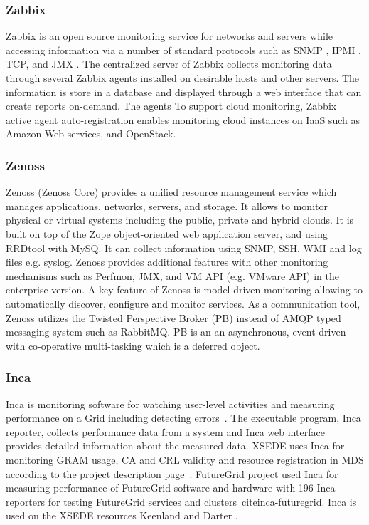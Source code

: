 \documentclass{sig-alternate-05-2015}
\begin{document}
\subsubsection{Zabbix}

Zabbix is an open source monitoring service for networks and servers while accessing information via a number of standard protocols such as SNMP \cite{case1990simple}, IPMI \cite{dell2009ipmi}, TCP, \cite{cerf2005protocol} and JMX \cite{perry2002java}. The centralized server of Zabbix collects monitoring data through several Zabbix agents installed on desirable hosts and other servers. The information is store in a database and displayed through a web interface that can create reports on-demand. The agents To support cloud monitoring, Zabbix active agent auto-registration enables monitoring cloud instances on IaaS such as Amazon Web services, and OpenStack.

\subsubsection{Zenoss}

Zenoss (Zenoss Core) provides a unified resource management service which manages applications, networks, servers, and storage. It allows to monitor physical or virtual systems including the public, private and hybrid clouds. It is built on top of the Zope object-oriented web application server, and using RRDtool with MySQ. It can collect information using SNMP, SSH, WMI and log files e.g. syslog. Zenoss provides additional features with other monitoring mechanisms such as Perfmon, JMX, and VM API (e.g. VMware API) in the enterprise version. A key feature of Zenoss is model-driven monitoring allowing to automatically discover, configure and monitor services. As a communication tool, Zenoss utilizes the Twisted Perspective Broker (PB) \cite{PerspectiveBroker} instead of AMQP typed messaging system such as RabbitMQ. PB is an an asynchronous, event-driven with co-operative multi-tasking which is a deferred object.

\subsubsection{Inca}

Inca is monitoring software for watching user-level activities and measuring performance on a Grid including detecting errors~\cite{inca}. The executable program, Inca reporter, collects performance data from a system and Inca web interface provides detailed information about the measured data. XSEDE uses Inca for monitoring GRAM usage, CA and CRL validity and resource registration in MDS according to the project description page~\cite{inca-xsede}.  FutureGrid project used Inca for measuring performance of FutureGrid software and hardware with 196 Inca reporters for testing FutureGrid services and clusters~cite{inca-futuregrid}. Inca is used on the XSEDE resources Keenland \cite{keeneland}\cite{keeneland-xsede} and Darter \cite{darter-nics}.
\end{document}
